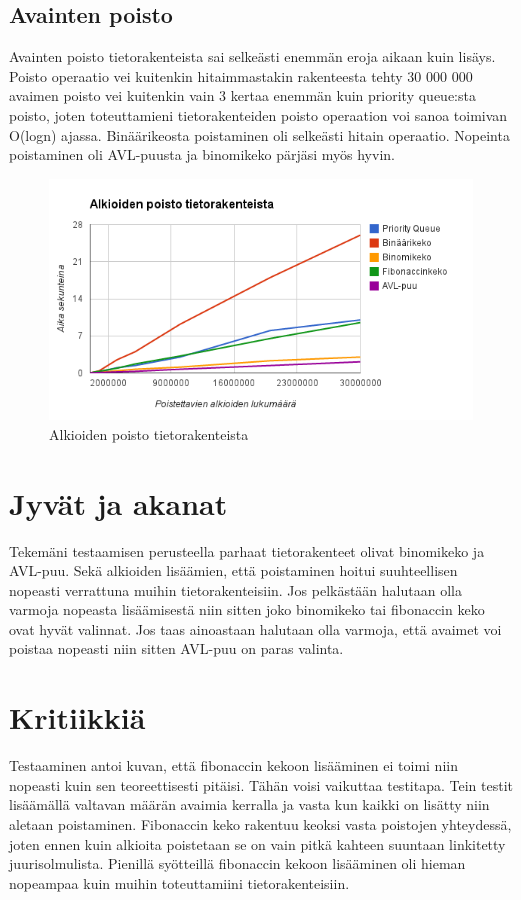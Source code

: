 \documentclass[11pt,a4paper]{article}
\begin{document}
\subsection{Avainten poisto}
Avainten poisto tietorakenteista sai selkeästi enemmän eroja aikaan kuin lisäys. Poisto operaatio vei kuitenkin hitaimmastakin rakenteesta tehty 30 000 000 avaimen poisto vei kuitenkin vain 3 kertaa enemmän kuin priority queue:sta poisto, joten toteuttamieni tietorakenteiden poisto operaation voi sanoa toimivan O(logn) ajassa. Binäärikeosta poistaminen oli selkeästi hitain operaatio. Nopeinta poistaminen oli AVL-puusta ja binomikeko pärjäsi myös hyvin.
\begin{figure}[h]
\centering
\includegraphics[scale=0.7]{alkioidenpoisto.png}
\caption{Alkioiden poisto tietorakenteista}
\end{figure}
\section{Jyvät ja akanat}
Tekemäni testaamisen perusteella parhaat tietorakenteet olivat binomikeko ja AVL-puu. Sekä alkioiden lisäämien, että poistaminen hoitui suuhteellisen nopeasti verrattuna muihin tietorakenteisiin. Jos pelkästään halutaan olla varmoja nopeasta lisäämisestä niin sitten joko binomikeko tai fibonaccin keko ovat hyvät valinnat. Jos taas ainoastaan halutaan olla varmoja, että avaimet voi poistaa nopeasti niin sitten AVL-puu on paras valinta. 
\section{Kritiikkiä}
Testaaminen antoi kuvan, että fibonaccin kekoon lisääminen ei toimi niin nopeasti kuin sen teoreettisesti pitäisi. Tähän voisi vaikuttaa testitapa. Tein testit lisäämällä valtavan määrän avaimia kerralla ja vasta kun kaikki on lisätty niin aletaan poistaminen. Fibonaccin keko rakentuu keoksi vasta poistojen yhteydessä, joten ennen kuin alkioita poistetaan se on vain pitkä kahteen suuntaan linkitetty juurisolmulista.
Pienillä syötteillä fibonaccin kekoon lisääminen oli hieman nopeampaa kuin muihin toteuttamiini tietorakenteisiin.
\end{document}
